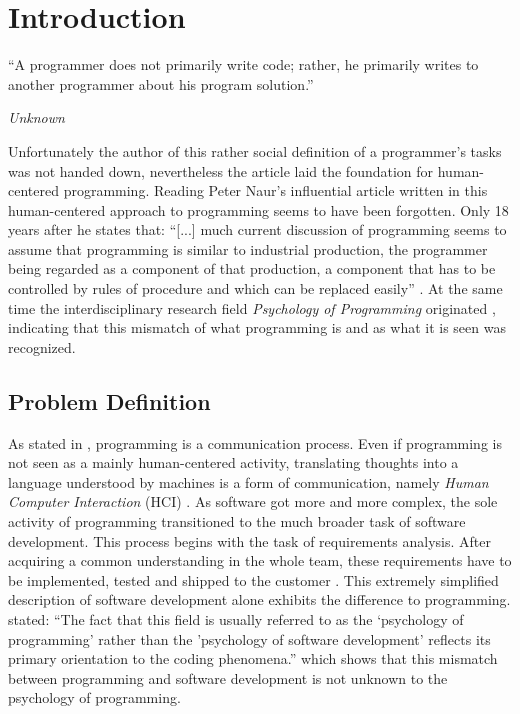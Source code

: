 \chapter{Introduction}
\label{chap:introduction}
\epigraph{``A programmer does not primarily write code; rather, he primarily writes to another programmer about his program solution.''}{\textit{Unknown}}
\noindent
Unfortunately the author of this rather social definition of a programmer's tasks was not handed down, nevertheless the article \textcite{anonymous_what_1967} laid the foundation for human-centered programming.
Reading Peter Naur's influential article  written in \citeyear{naur_programming_1985} \autocite{naur_programming_1985} this human-centered approach to programming seems to have been forgotten. Only 18 years after  he states that: ``[...] much current discussion of programming seems to assume that programming is similar to industrial production, the programmer being regarded as a component of that production, a component that has to be controlled by rules of procedure and which can be replaced easily'' \autocite{naur_programming_1985}.
At the same time the interdisciplinary research field \emph{Psychology of Programming} originated \autocite{myers_past_2009}, indicating that this mismatch of what programming is and as what it is seen was recognized.


\section{Problem Definition}
\label{sec:problem-definition}
As stated in \textcite{anonymous_what_1967}, programming is a communication process.
Even if programming is not seen as a mainly human-centered activity, translating thoughts into a language understood by machines is a form of communication, namely \emph{Human Computer Interaction} (HCI) \autocite{myers_past_2009}.
As software got more and more complex, the sole activity of programming transitioned to the much broader task of software development.
This process begins with the task of requirements analysis.
After acquiring a common understanding in the whole team, these requirements have to be implemented, tested and shipped to the customer \autocite{mayr_projekt_2005}.
This extremely simplified description of software development alone exhibits the difference to programming.
\citeauthor{curtis_psychology_1990} stated: ``The fact that this field is usually referred to as the `psychology of programming' rather than the 'psychology of software development' reflects its primary orientation to the coding phenomena.'' \autocite[267]{curtis_psychology_1990} which shows that this mismatch between programming and software development is not unknown to the psychology of programming.


